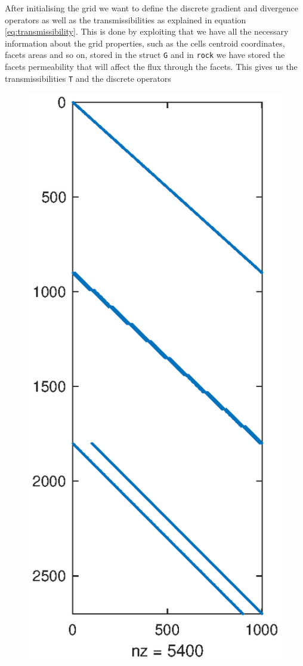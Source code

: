 After initialising the grid we want to define the discrete gradient and divergence operators as well as the transmissibilities as explained in equation \eqref{eq:transmissibility}. This is done by exploiting that we have all the necessary information about the grid properties, such as the cells centroid coordinates, facets areas and so on, stored in the struct \texttt{G} and in \texttt{rock} we have stored the facets permeability that will affect the flux through the facets. This gives us the transmissibilities \texttt{T} and the discrete operators


\begin{figure}
    \includegraphics[width=\linewidth]{figures/flowSolver_discrete_operators_C.eps}

\end{figure}
